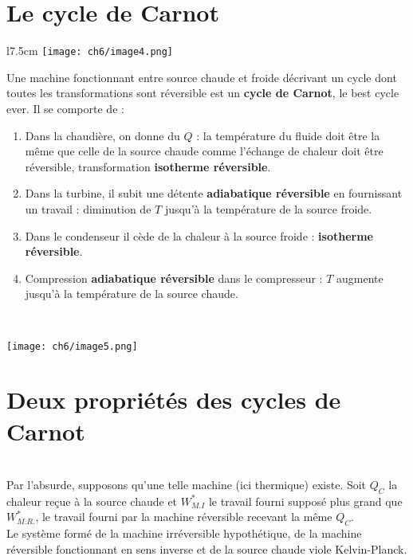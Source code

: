 	\section{Le cycle de Carnot}
	\begin{wrapfigure}[9]{l}{7.5cm}
	\vspace{5mm}
	\texttt{[image: ch6/image4.png]}
	\end{wrapfigure}
	Une machine fonctionnant entre source chaude et froide décrivant 
	un cycle dont toutes les transformations sont réversible est un 
	\textbf{cycle de Carnot}, le best cycle ever. Il se comporte de :
	\begin{enumerate}
	\item Dans la chaudière, on donne du $Q$ : la température du fluide 
	doit être la même que celle de la source chaude comme l'échange de chaleur
	doit être réversible, transformation \textbf{isotherme réversible}.
	\item Dans la turbine, il subit une détente \textbf{adiabatique réversible} 
	en fournissant un travail : diminution de $T$ jusqu'à la température 
	de la source froide.
	\item Dans le condenseur il cède de la chaleur à la source froide : 
	\textbf{isotherme réversible}.
	\item Compression \textbf{adiabatique réversible} dans le compresseur : $T$ 
	augmente jusqu'à la température de la source chaude.
	\end{enumerate}\ 
	\begin{center}
		\texttt{[image: ch6/image5.png]}
	\end{center}
	
	\section{Deux propriétés des cycles de Carnot}
	\ \\
	Par l'absurde, supposons qu'une telle machine (ici thermique) 
	existe. Soit $Q_C$ la chaleur reçue à la source chaude et $W_{M.I}^*$ 
	le travail fourni supposé plus grand que $W_{M.R.}^*$, le travail 
	fourni par la machine réversible recevant la même $Q_C$.\\
	Le système formé de la machine irréversible hypothétique, de la 
	machine réversible fonctionnant en sens inverse et de la source 
	chaude viole Kelvin-Planck.
	
